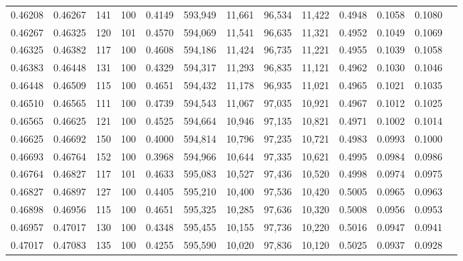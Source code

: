 \begin{tabular}{rrrrrrrrrrrrr}
0.46208 & 0.46267 &   141 & 100 &                                     0.4149 & 593,949 &  11,661 &  96,534 &  11,422 & 0.4948 & 0.1058 & 0.1080 \\
0.46267 & 0.46325 &   120 & 101 &                                     0.4570 & 594,069 &  11,541 &  96,635 &  11,321 & 0.4952 & 0.1049 & 0.1069 \\
0.46325 & 0.46382 &   117 & 100 &                                     0.4608 & 594,186 &  11,424 &  96,735 &  11,221 & 0.4955 & 0.1039 & 0.1058 \\
0.46383 & 0.46448 &   131 & 100 &                                     0.4329 & 594,317 &  11,293 &  96,835 &  11,121 & 0.4962 & 0.1030 & 0.1046 \\
0.46448 & 0.46509 &   115 & 100 &                                     0.4651 & 594,432 &  11,178 &  96,935 &  11,021 & 0.4965 & 0.1021 & 0.1035 \\
0.46510 & 0.46565 &   111 & 100 &                                     0.4739 & 594,543 &  11,067 &  97,035 &  10,921 & 0.4967 & 0.1012 & 0.1025 \\
0.46565 & 0.46625 &   121 & 100 &                                     0.4525 & 594,664 &  10,946 &  97,135 &  10,821 & 0.4971 & 0.1002 & 0.1014 \\
0.46625 & 0.46692 &   150 & 100 &                                     0.4000 & 594,814 &  10,796 &  97,235 &  10,721 & 0.4983 & 0.0993 & 0.1000 \\
0.46693 & 0.46764 &   152 & 100 &                                     0.3968 & 594,966 &  10,644 &  97,335 &  10,621 & 0.4995 & 0.0984 & 0.0986 \\
0.46764 & 0.46827 &   117 & 101 &                                     0.4633 & 595,083 &  10,527 &  97,436 &  10,520 & 0.4998 & 0.0974 & 0.0975 \\
0.46827 & 0.46897 &   127 & 100 &                                     0.4405 & 595,210 &  10,400 &  97,536 &  10,420 & 0.5005 & 0.0965 & 0.0963 \\
0.46898 & 0.46956 &   115 & 100 &                                     0.4651 & 595,325 &  10,285 &  97,636 &  10,320 & 0.5008 & 0.0956 & 0.0953 \\
0.46957 & 0.47017 &   130 & 100 &                                     0.4348 & 595,455 &  10,155 &  97,736 &  10,220 & 0.5016 & 0.0947 & 0.0941 \\
0.47017 & 0.47083 &   135 & 100 &                                     0.4255 & 595,590 &  10,020 &  97,836 &  10,120 & 0.5025 & 0.0937 & 0.0928 \\

\end{tabular}
